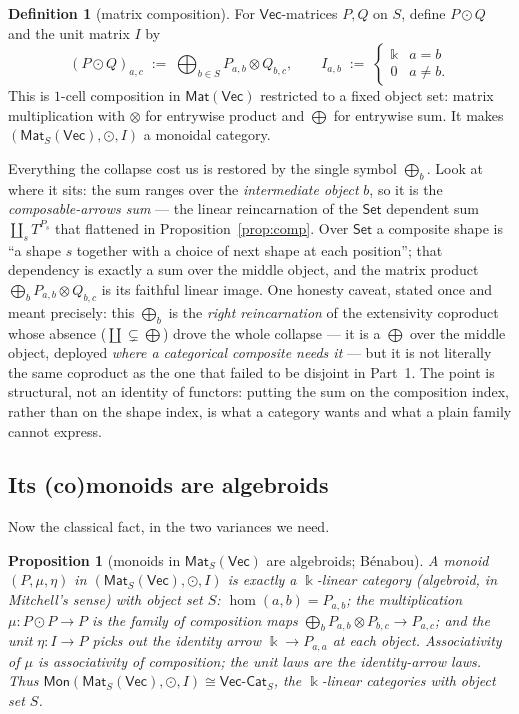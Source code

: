 \documentclass[11pt]{amsart}
\theoremstyle{plain}
\newtheorem{proposition}[theorem]{Proposition}
\theoremstyle{definition}
\newtheorem{definition}[theorem]{Definition}
\renewcommand{\Vec}{\mathsf{Vec}}
\newcommand{\Set}{\mathsf{Set}}
\newcommand{\Mon}{\mathsf{Mon}}
\newcommand{\Mat}{\mathsf{Mat}}
\newcommand{\VCat}{\Vec\text{-}\mathsf{Cat}}
\newcommand{\fld}{\Bbbk}
\newcommand{\iso}{\cong}
\DeclareMathOperator{\dcoprod}{\textstyle\coprod}
\begin{document}
\begin{definition}[matrix composition]\label{def:matcomp}
For $\Vec$-matrices $P,Q$ on $S$, define $P\odot Q$ and the unit matrix $I$ by
\[
  (P\odot Q)_{a,c}\;:=\;\bigoplus_{b\in S} P_{a,b}\otimes Q_{b,c},
  \qquad
  I_{a,b}\;:=\;\begin{cases}\fld & a=b\\ 0 & a\neq b.\end{cases}
\]
This is $1$-cell composition in $\Mat(\Vec)$ restricted to a fixed object set:
matrix multiplication with $\otimes$ for entrywise product and $\bigoplus$ for
entrywise sum. It makes $(\Mat_S(\Vec),\odot,I)$ a monoidal category.
\end{definition}

Everything the collapse cost us is restored by the single symbol $\bigoplus_b$. Look
at where it sits: the sum ranges over the \emph{intermediate object} $b$, so it is
the \emph{composable-arrows sum} --- the linear reincarnation of the $\Set$
dependent sum $\dcoprod_{s} T^{P_s}$ that flattened in
Proposition~\ref{prop:comp}. Over $\Set$ a composite shape is ``a shape $s$
together with a choice of next shape at each position''; that dependency is exactly
a sum over the middle object, and the matrix product $\bigoplus_b P_{a,b}\otimes
Q_{b,c}$ is its faithful linear image. One honesty caveat, stated once and meant
precisely: this $\bigoplus_b$ is the \emph{right reincarnation} of the extensivity
coproduct whose absence ($\dcoprod\subsetneq\bigoplus$) drove the whole collapse ---
it is a $\bigoplus$ over the middle object, deployed \emph{where a categorical
composite needs it} --- but it is not literally the same coproduct as the one that
failed to be disjoint in Part~1. The point is structural, not an identity of
functors: putting the sum on the composition index, rather than on the shape index,
is what a category wants and what a plain family cannot express.

\subsection{Its (co)monoids are algebroids}

Now the classical fact, in the two variances we need.

\begin{proposition}[monoids in $\Mat_S(\Vec)$ are algebroids; B\'enabou]
\label{prop:algebroid-mon}
A monoid $(P,\mu,\eta)$ in $(\Mat_S(\Vec),\odot,I)$ is exactly a
$\fld$-linear category (algebroid, in Mitchell's sense) with object set $S$:
$\hom(a,b)=P_{a,b}$; the multiplication $\mu\colon P\odot P\to P$ is the family of
composition maps $\bigoplus_b P_{a,b}\otimes P_{b,c}\to P_{a,c}$; and the unit
$\eta\colon I\to P$ picks out the identity arrow $\fld\to P_{a,a}$ at each object.
Associativity of $\mu$ is associativity of composition; the unit laws are the
identity-arrow laws. Thus $\Mon(\Mat_S(\Vec),\odot,I)\iso\VCat_S$, the
$\fld$-linear categories with object set $S$.
\end{proposition}
\end{document}
